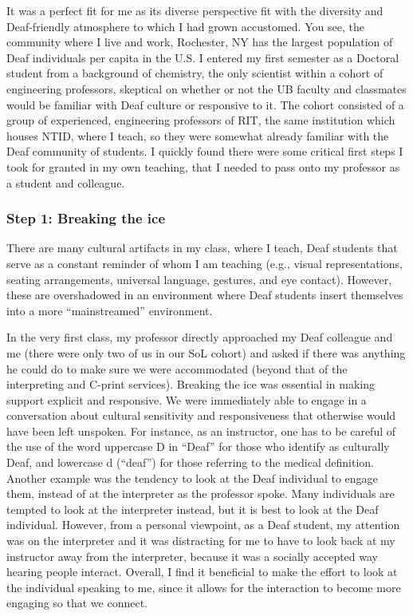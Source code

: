 \documentclass[11.5pt]{sig-alternate} %
\begin{document}
\begin{large}
It was a perfect fit for me as its diverse perspective fit with the diversity and Deaf-friendly atmosphere to which I had grown accustomed.  You see, the community where I live and work, Rochester, NY has the largest population of Deaf individuals per capita in the U.S.  I entered my first semester as a Doctoral student from a background of chemistry, the only scientist within a cohort of engineering professors, skeptical on whether or not the UB faculty and classmates would be familiar with Deaf culture or responsive to it.  The cohort consisted of a group of experienced, engineering professors of RIT, the same institution which houses NTID, where I teach, so they were somewhat already familiar with the Deaf community of students. I quickly found there were some critical first steps I took for granted in my own teaching, that I needed to pass onto my professor as a student and colleague. 

\subsubsection*{Step 1: Breaking the ice}

There are many cultural artifacts in my class, where I teach, Deaf students that serve as a constant reminder of whom I am teaching (e.g., visual representations, seating arrangements, universal language, gestures, and eye contact).  However, these are overshadowed in an environment where Deaf students insert themselves into a more “mainstreamed” environment.  

In the very first class, my professor directly approached my Deaf colleague and me (there were only two of us in our SoL cohort) and asked if there was anything he could do to make sure we were accommodated (beyond that of the interpreting and C-print services).  Breaking the ice was essential in making support explicit and responsive. We were immediately able to engage in a conversation about cultural sensitivity and responsiveness that otherwise would have been left unspoken.  For instance, as an instructor, one has to be careful of the use of the word uppercase D in “Deaf” for those who identify as culturally Deaf, and lowercase d (“deaf”) for those referring to the medical definition.  Another example was the tendency to look at the Deaf individual to engage them, instead of at the interpreter as the professor spoke.  Many individuals are tempted to look at the interpreter instead, but it is best to look at the Deaf individual.  However, from a personal viewpoint, as a Deaf student, my attention was on the interpreter and it was distracting for me to have to look back at my instructor away from the interpreter, because it was a socially accepted way hearing people interact.  Overall, I find it beneficial to make the effort to look at the individual speaking to me, since it allows for the interaction to become more engaging so that we connect.



\end{large}
\end{document}
